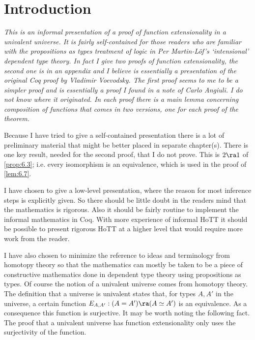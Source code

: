 
\section{Introduction}
{\it This is an informal presentation of a proof of function extensionality in a univalent universe.  It is fairly self-contained for those readers who are familiar with the propositions as types treatment of logic in Per Martin-L\"{o}f's `intensional' dependent type theory.  In fact I give two proofs of function extensionality, the second one is in an appendix and I believe is essentially a presentation of the original Coq proof by Vladimir Voevodsky.  The first proof seems to me to be a simpler proof and is essentially a proof I found in a note of Carlo Angiuli.  I do not know where it originated.  In each proof there is a main lemma concerning composition of functions that comes in two versions, one for each proof of the theorem.

Because I have tried to give a self-contained presentation there is a lot of preliminary material that might be better placed in separate chapter(s).  There is one key result, needed for the second proof, that I do not prove.
This is $2\ra 1$ of \autoref{prop:6.3}; i.e. every isomorphism is an 
equivalence, which is used in the proof of \autoref{lem:6.7}.

I have chosen to give a low-level presentation, where the reason for most 
inference steps is explicitly given.  So there should be little doubt in the readers mind that the mathematics is rigorous.  Also it should be fairly routine to implement the informal mathematics in Coq.  With more experience of informal HoTT it should be possible to present rigorous HoTT at a higher level that would require more work from the reader.

I have also chosen to minimize the reference to ideas and terminology from homotopy theory so that the mathematics can mostly be taken to be a piece of constructive mathematics done in dependent type theory using propositions as types.  Of course the notion of a univalent universe comes from homotopy theory.  The definition that a universe is univalent states that, for types $A,A'$ in the universe, a certain function $E_{A,A'} :(A=A')\ra (A\simeq A')$ is an equivalence.  As a consequence this function is surjective.  It may be worth noting the following fact. The proof that a univalent universe has function extensionality only uses the surjectivity of the function.
}

